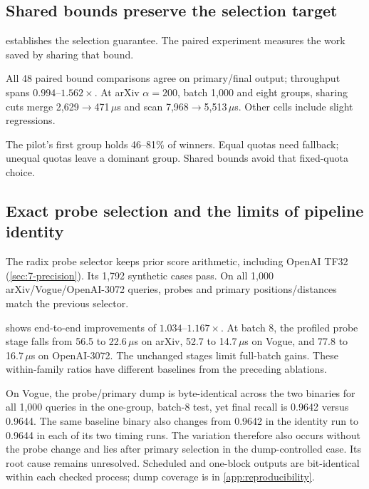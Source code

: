 

\subsection{Shared bounds preserve the selection target}

 establishes the selection guarantee. The
paired experiment measures the work saved by sharing that bound.

All 48 paired bound comparisons agree on primary/final output; throughput spans $0.994$--$1.562\times$. At arXiv $\alpha=200$, batch 1,000 and eight groups, sharing cuts merge 2,629$\to$471\,$\mu$s and scan 7,968$\to$5,513\,$\mu$s. Other cells include slight regressions.

The pilot's first group holds 46--81\% of winners. Equal quotas need fallback; unequal quotas leave a dominant group. Shared bounds avoid that fixed-quota choice.

\subsection{Exact probe selection and the limits of pipeline identity}

The radix probe selector keeps prior score arithmetic, including OpenAI TF32 (\cref{sec:7-precision}). Its 1,792 synthetic cases pass. On all 1,000 arXiv/Vogue/OpenAI-3072 queries, probes and primary positions/distances match the previous selector.

\begin{table}[tbp]
\centering
\caption[Probe-selection throughput ratios]{v69/v65 end-to-end throughput ratios for the exact computed-score probe
 change. Each workload--batch comparison has ten timing rounds per binary,
 collected in alternating runs. Values above one favour v69.}
\label{tab:7-probe}
\small

\end{table}

 shows end-to-end improvements of $1.034$--$1.167\times$.
At batch 8, the profiled probe stage falls from 56.5 to 22.6\,$\mu$s
on arXiv, 52.7 to 14.7\,$\mu$s on Vogue, and 77.8 to 16.7\,$\mu$s
on OpenAI-3072. The unchanged stages limit full-batch gains. These
within-family ratios have different baselines from the preceding ablations.

On Vogue, the probe/primary dump is
byte-identical across the two binaries for all 1,000 queries in the
one-group, batch-8 test, yet final recall is 0.9642 versus 0.9644. The
same baseline binary also changes from 0.9642 in the identity run to
0.9644 in each of its two timing runs. The variation therefore also
occurs without the probe change and lies after primary selection in the
dump-controlled case. Its root cause remains unresolved. Scheduled and
one-block outputs are bit-identical within each checked process; dump
coverage is in \cref{app:reproducibility}.

